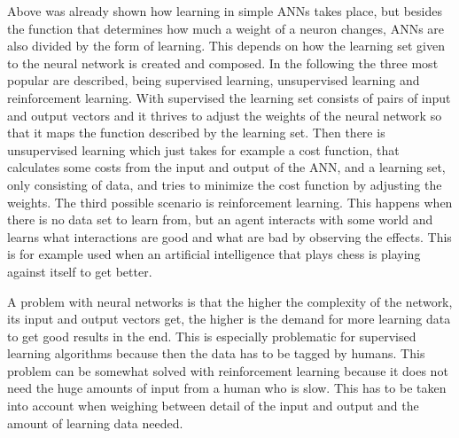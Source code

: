 Above was already shown how learning in simple ANNs takes place, but besides the function that determines how much a weight of a neuron changes, ANNs are also divided by the form of learning. This depends on how the learning set given to the neural network is created and composed. In the following the three most popular are described, being supervised learning, unsupervised learning and reinforcement learning. With supervised the learning set consists of pairs of input and output vectors and it thrives to adjust the weights of the neural network so that it maps the function described by the learning set. Then there is unsupervised learning which just takes for example a cost function, that calculates some costs from the input and output of the ANN, and a learning set, only consisting of data, and tries to minimize the cost function by adjusting the weights. The third possible scenario is reinforcement learning. This happens when there is no data set to learn from, but an agent interacts with some world and learns what interactions are good and what are bad by observing the effects. This is for example used when an artificial intelligence that plays chess is playing against itself to get better.

A problem with neural networks is that the higher the complexity of the network, its input and output vectors get, the higher is the demand for more learning data to get good results in the end. This is especially problematic for supervised learning algorithms because then the data has to be tagged by humans. This problem can be somewhat solved with reinforcement learning because it does not need the huge amounts of input from a human who is slow. This has to be taken into account when weighing between detail of the input and output and the amount of learning data needed.
